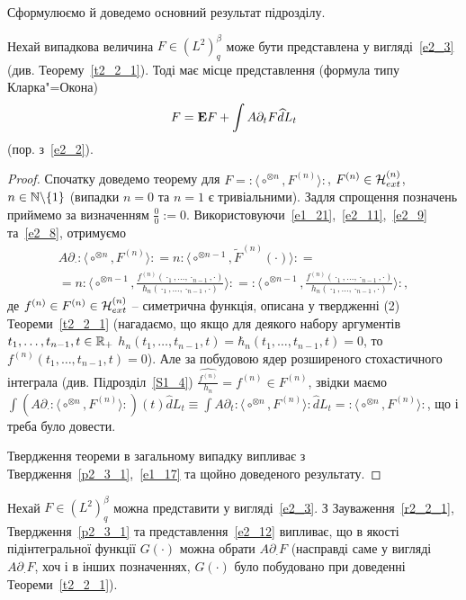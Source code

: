 Сформулюємо й доведемо основний результат підрозділу.
\begin{subtheorem}\label{t2_3_1}
Нехай випадкова величина $F\in (L^2)^\beta_q$ може бути представлена у вигляді~\eqref{e2_3}
(див. Теорему~\ref{t2_2_1}). Тоді має місце представлення (формула типу Кларка"=Окона)
\begin{equation}\label{e2_12}
F=\mathbf{E}{F}+\int A\partial_t F\widehat dL_t
\end{equation}
(пор. з~\eqref{e2_2}).
\end{subtheorem}
\begin{proof}
Спочатку доведемо теорему для $F={:\!\langle}\circ^{\otimes n},F^{(n)}{\rangle\!:}$,
$F^{(n)}\in\mathcal{H}_{ext}^{(n)}$, $n\in\mathbb{N}\backslash\{1\}$ (випадки $n=0$ та $n=1$ є
тривіальними). Задля спрощення позначень приймемо за визначенням $\frac{0}{0}:=0$.
Використовуючи~\eqref{e1_21},~\eqref{e2_11},~\eqref{e2_9} та~\eqref{e2_8}, отримуємо
\begin{gather*}
A\partial_\cdot{:\!\langle}\circ^{\otimes n},F^{(n)}{\rangle\!:}
=n{:\!\langle}\circ^{\otimes n-1},\widetilde F^{(n)}(\cdot){\rangle\!:}=\\
=n{:\!\langle}\circ^{\otimes n-1},\frac{f^{(n)}(\cdot_1,\dots,\cdot_{n-1},\cdot)}
{\hbar_n(\cdot_1,\dots,\cdot_{n-1},\cdot)}{\rangle\!:}
={:\!\langle}\circ^{\otimes n-1},\frac{f^{(n)}(\cdot_1,\dots,\cdot_{n-1},\cdot)}
{h_n(\cdot_1,\dots,\cdot_{n-1},\cdot)}{\rangle\!:},
\end{gather*}
де $f^{(n)}\in F^{(n)}\in\mathcal{H}_{ext}^{(n)}$ -- симетрична функція, описана у
твердженні (2) Теореми~\ref{t2_2_1} (нагадаємо, що якщо для деякого набору аргументів
$t_1,\dots,t_{n-1},t\in\mathbb{R}_+$ $h_n(t_1,\dots,t_{n-1},t)=\hbar_n(t_1,\dots,t_{n-1},t)=0$,
то $f^{(n)}(t_1,\dots,t_{n-1},t)=0$). Але за побудовою ядер розширеного стохастичного
інтеграла (див. Підрозділ~\ref{S1_4}) $\widehat{\frac{f^{(n)}}{h_n}}=f^{(n)}\in F^{(n)}$,
звідки маємо
$
\int (A\partial_\cdot{:\!\langle}\circ^{\otimes n},F^{(n)}{\rangle\!:})(t)\widehat dL_t
\equiv\int A\partial_t{:\!\langle}\circ^{\otimes n},F^{(n)}{\rangle\!:}\widehat dL_t
={:\!\langle}\circ^{\otimes n},F^{(n)}{\rangle\!:}
$,
що і треба було довести.

Твердження теореми в загальному випадку випливає з Твердження~\ref{p2_3_1},~\eqref{e1_17}
та щойно доведеного результату.
\end{proof}

\begin{subremark}\label{r2_3_1}
Нехай $F\in (L^2)^\beta_q$ можна представити у вигляді~\eqref{e2_3}.
З Зауваження~\ref{r2_2_1}, Твердження~\ref{p2_3_1} та представлення~\eqref{e2_12} випливає, що в
якості підінтегральної функції $G(\cdot)$ можна обрати $A\partial_\cdot F$ (насправді саме у
вигляді $A\partial_\cdot F$, хоч і в інших позначеннях, $G(\cdot)$ було побудовано при доведенні
Теореми~\ref{t2_2_1}).
\end{subremark}

